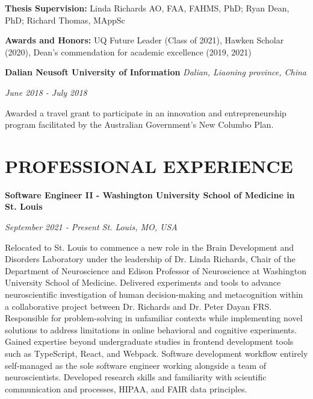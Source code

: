 \documentclass{article}
\begin{document}
  \textbf{Thesis Supervision:} Linda Richards AO, FAA, FAHMS, PhD; Ryan Dean, PhD; Richard Thomas, MAppSc

  \textbf{Awards and Honors:} UQ Future Leader (Class of 2021), Hawken Scholar (2020), Dean's commendation for academic excellence (2019, 2021)

  \medbreak

  \textbf{Dalian Neusoft University of Information} \hfill \textit{Dalian, Liaoning province, China}

  \textit{June 2018 - July 2018}

  Awarded a travel grant to participate in an innovation and entrepreneurship program facilitated by the Australian Government's New Columbo Plan.

  \section*{\centering\uppercase{Professional Experience}}

  {\large\textbf{Software Engineer II - Washington University School of Medicine in St. Louis}}

  \textit{September 2021 - Present \hfill St. Louis, MO, USA}

  Relocated to St. Louis to commence a new role in the Brain Development and Disorders Laboratory under the leadership of Dr. Linda Richards, Chair of the Department of Neuroscience and Edison Professor of Neuroscience at Washington University School of Medicine. Delivered experiments and tools to advance neuroscientific investigation of human decision-making and metacognition within a collaborative project between Dr. Richards and Dr. Peter Dayan FRS. Responsible for problem-solving in unfamiliar contexts while implementing novel solutions to address limitations in online behavioral and cognitive experiments. Gained expertise beyond undergraduate studies in frontend development tools such as TypeScript, React, and Webpack. Software development workflow entirely self-managed as the sole software engineer working alongside a team of neuroscientists. Developed research skills and familiarity with scientific communication and processes, HIPAA, and FAIR data principles.

  \medbreak
\end{document}
